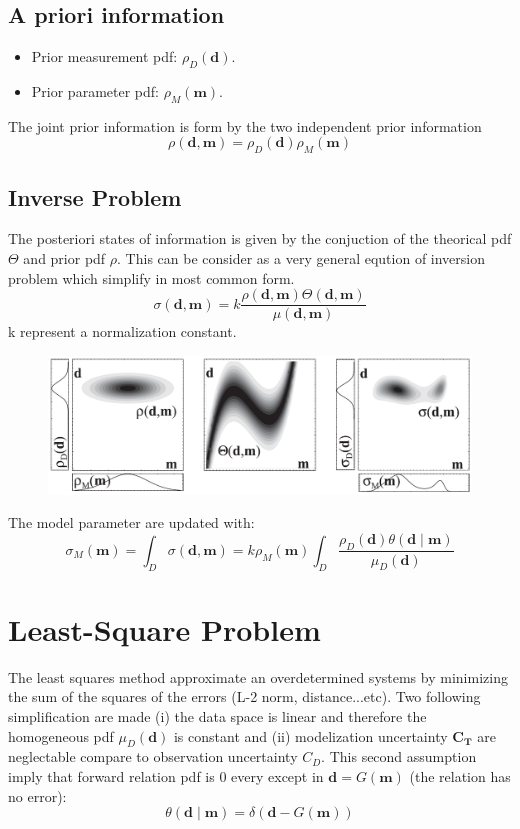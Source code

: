 \documentclass[twocolumn]{article}
\numberwithin{equation}{section}
\begin{document}
	\subsection{A priori information}
\begin{itemize}
	\item Prior measurement pdf: $\rho_D(\mathbf{d})$.
	\item Prior parameter pdf: $\rho_M(\mathbf{m})$.
\end{itemize}
The joint prior information is form by the two independent prior information 
$$\rho(\mathbf{d,m})=\rho_D(\mathbf{d}) \rho_M(\mathbf{m})$$


	\subsection{Inverse Problem}
The posteriori states of information is given by the conjuction of the theorical pdf $\Theta$ and prior pdf $\rho$. This can be consider as a very general eqution of inversion problem which simplify in most common form.
$$\sigma(\mathbf{d},\mathbf{m})=k\frac{\rho(\mathbf{d},\mathbf{m}) \Theta(\mathbf{d},\mathbf{m})}{\mu(\mathbf{d},\mathbf{m})}$$
k represent a normalization constant. 
\begin{figure}[H]
	\centering
	\includegraphics[width=.49\textwidth]{solution.png}
\end{figure}
The model parameter are updated with:
$$\boxed{\sigma_M(\mathbf{m})=\int_D\sigma(\mathbf{d},\mathbf{m})=k\rho_M(\mathbf{m})\int_D \frac{\rho_D(\mathbf{d})\theta(\mathbf{d \mid m}) }{\mu_D(\mathbf{d})}}$$
 

 
 



\newpage
\section{Least-Square Problem}
The least squares method approximate an overdetermined systems by minimizing the sum of the squares of the errors (L-2 norm, distance...etc).
Two following simplification are made (i) the data space is linear and therefore the homogeneous pdf $\mu_D(\mathbf{d})$ is constant and (ii) modelization uncertainty $\mathbf{C_T}$ are neglectable compare to observation uncertainty $C_D$. This second assumption imply that forward relation pdf is 0 every except in $\mathbf{d} = G(\mathbf{m})$ (the relation has no error):
$$\theta(\mathbf{d \mid m}) = \delta(\mathbf{d} - G(\mathbf{m}))$$
\end{document}

